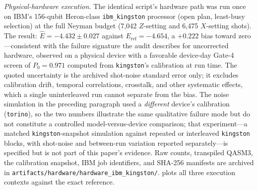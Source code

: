 \emph{Physical-hardware execution.} The identical script's hardware path was run once on IBM's 156-qubit Heron-class \texttt{ibm\_kingston} processor (open plan, least-busy selection) at the full Neyman budget (7{,}042 $Z$-setting and 6{,}475 $X$-setting shots). The result: $\hat{E}=-4.432\pm0.027$ against $E_{\mathrm{ref}}=-4.654$, a $+0.222$ bias toward zero---consistent with the failure signature the audit describes for uncorrected hardware, observed on a physical device with a favorable device-day Gate-4 screen of $P_0=0.971$ computed from \texttt{kingston}'s calibration at run time. The quoted uncertainty is the archived shot-noise standard error only; it excludes calibration drift, temporal correlations, crosstalk, and other systematic effects, which a single uninterleaved run cannot separate from the bias. The noise simulation in the preceding paragraph used a \emph{different} device's calibration (\texttt{torino}), so the two numbers illustrate the same qualitative failure mode but do not constitute a controlled model-versus-device comparison; that experiment---a matched \texttt{kingston}-snapshot simulation against repeated or interleaved \texttt{kingston} blocks, with shot-noise and between-run variation reported separately---is specified but is not part of this paper's evidence. Raw counts, transpiled QASM3, the calibration snapshot, IBM job identifiers, and SHA-256 manifests are archived in \texttt{artifacts/hardware/hardware\_ibm\_kingston/}.  plots all three execution contexts against the exact reference.

